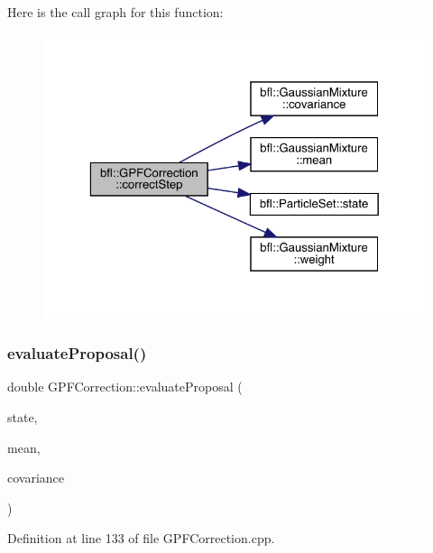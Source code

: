 Here is the call graph for this function\+:
\nopagebreak
\begin{figure}[H]
\begin{center}
\leavevmode
\includegraphics[width=323pt]{classbfl_1_1GPFCorrection_a291a05d78f7f2ee835140bfe4995a2bb_cgraph}
\end{center}
\end{figure}
\mbox{\label{classbfl_1_1GPFCorrection_a076c8609b08b17fb3c32eaa4e5b7c3eb}} 
\subsubsection{\texorpdfstring{evaluate\+Proposal()}{evaluateProposal()}}
{\footnotesize\ttfamily double G\+P\+F\+Correction\+::evaluate\+Proposal (\begin{DoxyParamCaption}\item[{const Eigen\+::\+Vector\+Xd \&}]{state,  }\item[{const Eigen\+::\+Vector\+Xd \&}]{mean,  }\item[{const Eigen\+::\+Matrix\+Xd \&}]{covariance }\end{DoxyParamCaption})\hspace{0.3cm}{\ttfamily [protected]}}



Definition at line 133 of file G\+P\+F\+Correction.\+cpp.

\mbox{\label{classbfl_1_1GPFCorrection_a0df1185be7731e9077eec265b8d6ff8e}} 
